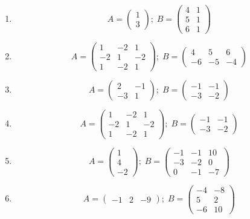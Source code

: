 \documentclass[
]{book}
\theoremstyle{definition}
\theoremstyle{definition}
\theoremstyle{definition}
\theoremstyle{remark}
\begin{document}
\begin{enumerate}
\def\labelenumi{\arabic{enumi}.}
\item
  \[ 
  A =  \left(\begin{array}{c}1 \\ 3 \end{array}\right);  \;  B = \left(\begin{array}{cc}4 & 1 \\5 & 1 \\6 & 1\end{array}\right)
  \]
\item
  \[ 
  A =   \left(\begin{array}{ccc}1 & -2 & 1 \\-2 & 1 & -2 \\1 & -2 & 1\end{array}\right);  \;  B = \left(\begin{array}{ccc}4 & 5 & 6 \\-6 & -5 & -4\end{array}\right)
  \]
\item
  \[ 
  A =  \left(\begin{array}{cc}2 & -1 \\-3 & 1\end{array}\right)  ;  \;  B = \left(\begin{array}{cc}-1 & -1 \\-3 & -2\end{array}\right)
  \]
\item
  \[ A =   \left(\begin{array}{ccc}1 & -2 & 1 \\-2 & 1 & -2 \\1 & -2 & 1\end{array}\right)  ;  \;  B =  \left(\begin{array}{cc}-1 & -1 \\-3 & -2\end{array}\right)
  \]
\item
  \[ 
  A =   \left(\begin{array}{c} 1 \\ 4 \\ -2\end{array}\right) ;  \;  B =  \left(\begin{array}{ccc}-1 & -1 & 10  \\-3 & -2 & 0 \\ 0 & -1 & -7 \end{array}\right)
  \]
\item
  \[ 
  A =  \left(\begin{array}{ccc} -1 &  2 & -9 \end{array}\right);  \;  B = \left(\begin{array}{cc}-4 & -8 \\5 & 2 \\-6 & 10\end{array}\right)
  \]
\end{enumerate}
\end{document}
